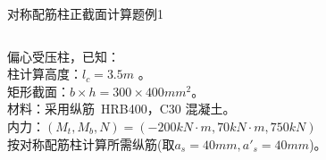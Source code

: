 

\begin{frame}[plain]{ 对称配筋柱正截面计算题例1 }
\begin{columns}[onlytextwidth]
\begin{column}{0.75\textwidth}
偏心受压柱，已知：\\
柱计算高度：$l_c= 3.5 m$ 。 \\
矩形截面：$b \times h = 300 \times 400 mm^2$。\\
材料：采用纵筋~HRB400，C30 混凝土。\\
内力：$(M_t, M_b, N) = ( -200 kN\cdot m, 70 kN\cdot m, 750 kN)$ \\
按对称配筋柱计算所需纵筋(取$a_s = 40 mm, a'_s = 40 mm$)。\\
\end{column}

\begin{column}{0.25\textwidth}
\begin{center}
\end{center}
\end{column}

\end{columns}
\end{frame}

